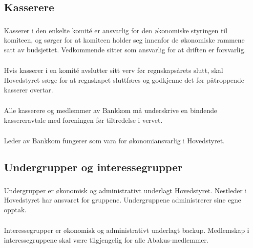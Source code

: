 \subsection{Kasserere}

\subsubsection{}
Kasserer i den enkelte komité er ansvarlig for den økonomiske styringen til
komiteen, og sørger for at komiteen holder seg innenfor de økonomiske rammene satt av budsjettet.
Vedkommende sitter som ansvarlig for at driften er forsvarlig.

\subsubsection{}
Hvis kasserer i en komité avslutter sitt verv før regnskapsårets slutt, skal Hovedstyret sørge for at regnskapet sluttføres og godkjenne det før påtroppende kasserer overtar.

\subsubsection{}
Alle kasserere og medlemmer av Bankkom må underskrive en bindende kassereravtale med foreningen før tiltredelse i vervet.

\subsubsection{}
Leder av Bankkom fungerer som vara for økonomiansvarlig i Hovedstyret.

\subsection{Undergrupper og interessegrupper}

\subsubsection{}
Undergrupper er økonomisk og administrativt underlagt Hovedstyret. Nestleder i
Hovedstyret har ansvaret for gruppene. Undergruppene administrerer sine egne
opptak.

\subsubsection{}
Interessegrupper er økonomisk og administrativt underlagt backup. Medlemskap i
interessegruppene skal være tilgjengelig for alle Abakus-medlemmer.
